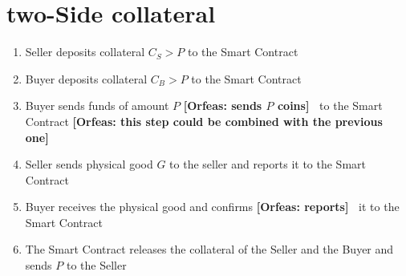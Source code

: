 \documentclass{cacthesis}
\newcommand{\authnote}[3]{{ \footnotesize \textbf{#1[#2: #3]~}}}
\newcommand{\orfnote}[1]{\authnote{\color{blue}}{Orfeas}{#1}}
\begin{document}
\section{two-Side collateral}
\begin{enumerate}
    \item Seller deposits collateral $C_S > P$ to the Smart Contract
    \item Buyer deposits collateral $C_B > P$ to the Smart Contract
    \item Buyer sends funds of amount $P$ \orfnote{sends $P$ coins} to the Smart
    Contract \orfnote{this step could be combined with the previous one}
    \item Seller sends physical good $G$ to the seller and reports it to the Smart Contract
    \item Buyer receives the physical good and confirms \orfnote{reports} it to the Smart Contract
    \item The Smart Contract releases the collateral of the Seller and the Buyer and sends $P$ to the Seller
\end{enumerate}
\end{document}
